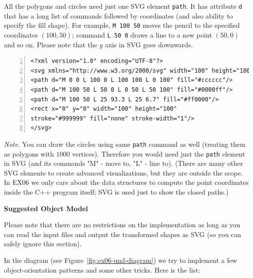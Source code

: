 \documentclass[11pt]{article}
\begin{document}
All the polygons and circles need just one SVG element {\tt path}. 
It has attribute {\tt d} that has a long list of
commands followed by coordinates (and also ability to specify the fill shape). 
For example, {\tt M 100 50} moves the pencil to the specified coordinates $(100,50)$; 
command {\tt L 50 0} draws a line to a new point $(50,0)$ and so on. 
Please note that the $y$ axis in SVG goes downwards. 

\renewcommand{\FancyVerbFormatLine}[1]{%
  \ifnum\value{FancyVerbLine}=4
    \textcolor{blue}{#1}%
  \else
	\ifnum\value{FancyVerbLine}=5
      \textcolor{red}{#1}%
    \else	
    #1%
	\fi
  \fi
}

\begin{Verbatim}[frame=single,numbers=left]
<?xml version="1.0" encoding="UTF-8"?>
<svg xmlns="http://www.w3.org/2000/svg" width="100" height="100">
<path d="M 0 0 L 100 0 L 100 100 L 0 100" fill="#cccccc"/>
<path d="M 100 50 L 50 0 L 0 50 L 50 100" fill="#0000ff"/>
<path d="M 100 50 L 25 93.3 L 25 6.7" fill="#ff0000"/>
<rect x="0" y="0" width="100" height="100" 
stroke="#999999" fill="none" stroke-width="1"/>
</svg>
\end{Verbatim}



{\em Note.} You can draw the circles using same {\tt path} command as well 
(treating them as polygons with $1000$ vertices). 
Therefore you would need just the {\tt path} element in SVG (and its commands 
"M" - move to, "L" - line to).
(There are many other SVG elements to create advanced visualizations, but they are
outside the scope. In EX06 we only care about the data structures 
to compute the point coordinates inside the C++ program itself; SVG is used just 
to show the closed paths.) 

\vspace{20pt}
{\bf \large Suggested Object Model}

Please note that there are no restrictions on the implementation as long as you
can read the input files and output the transformed shapes as SVG (so you can safely ignore
this section). 

In the diagram (see Figure~\ref{fig:ex06-uml-diagram}) we try to implement a few 
object-orientation patterns and some other tricks. Here is the list:
\end{document}
